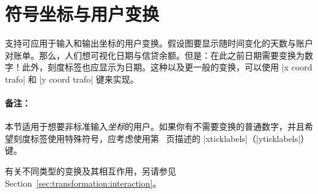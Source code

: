 
\section{符号坐标与用户变换}

\PGFPlots{} 支持可应用于输入和输出坐标的用户变换。假设图要显示随时间变化的天数与账户对账单。那么，人们想可视化日期与信贷余额。但是：在此之前日期需要变换为数字！此外，刻度标签也应显示为日期。这种以及更一般的变换，可以使用 |x coord trafo| 和 |y coord trafo| 键来实现。


\paragraph{备注：}

本节适用于想要非标准输入\emph{坐标}的用户。如果你有不需要变换的普通数字，并且希望刻度标签使用特殊符号，应考虑使用第~\pageref{pgfplots:key:xticklabels} 页描述的 |xticklabels|（|yticklabels|）键。

有关不同类型的变换及其相互作用，另请参见 Section~\ref{sec:transformation:interaction}。

